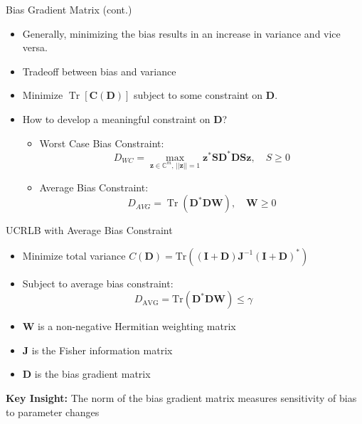 \documentclass{beamer}
\begin{document}
\begin{frame}{Bias Gradient Matrix (cont.)}
  \begin{itemize}
    \item Generally, minimizing the bias results in an increase in variance and vice versa.
    \item Tradeoff between bias and variance
    \item Minimize $\operatorname{Tr}[\mathbf{C}(\mathbf{D})]$ subject to some constraint on $\mathbf{D}$.
    \item How to develop a meaningful constraint on $\mathbf{D}$?
    \pause
    \begin{itemize}
    \item Worst Case Bias Constraint:
        \[
        D_{WC} = 
        \max_{\mathbf{z} \in \mathbb{C}^m, \, ||\mathbf{z}|| = 1} \mathbf{z}^* \mathbf{S} \mathbf{D}^* \mathbf{D} 
        \mathbf{S} \mathbf{z}, \quad S \geq 0
        \]
        \item Average Bias Constraint:
        \[
        D_{AVG} = \operatorname{Tr}(\mathbf{D}^*\mathbf{D W}), \quad \mathbf{W} \geq 0
        \]
    \end{itemize}
    
  \end{itemize}
\end{frame}

\begin{frame}{UCRLB with Average Bias Constraint}
\begin{itemize}
\item Minimize total variance $C(\mathbf{D}) = \text{Tr}((\mathbf{I} + \mathbf{D})\mathbf{J}^{-1}(\mathbf{I} + \mathbf{D})^*)$
\item Subject to average bias constraint:
\[ D_{\text{AVG}} = \text{Tr}(\mathbf{D}^*\mathbf{D}\mathbf{W}) \leq \gamma \]
\item $\mathbf{W}$ is a non-negative Hermitian weighting matrix
\item $\mathbf{J}$ is the Fisher information matrix
\item $\mathbf{D}$ is the bias gradient matrix
\end{itemize}

\textbf{Key Insight:} The norm of the bias gradient matrix measures sensitivity of bias to parameter changes

\end{frame}
\end{document}
